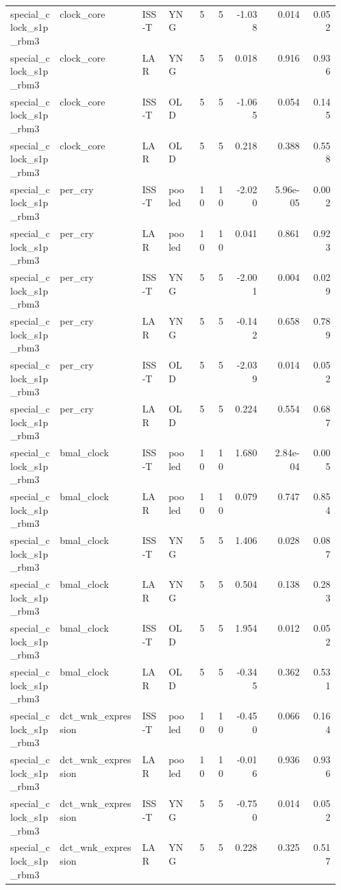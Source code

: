 \documentclass[11pt]{article}
\begin{document}
\begin{landscape}
\begin{longtable}{p{0.15\linewidth}p{0.25\linewidth}p{0.08\linewidth}p{0.08\linewidth}rrrrr}
special\_clock\_s1p\_rbm3 & clock\_core & ISS-T & YNG & 5 & 5 & -1.038 & 0.014 & 0.052 \\
special\_clock\_s1p\_rbm3 & clock\_core & LAR & YNG & 5 & 5 & 0.018 & 0.916 & 0.936 \\
special\_clock\_s1p\_rbm3 & clock\_core & ISS-T & OLD & 5 & 5 & -1.065 & 0.054 & 0.145 \\
special\_clock\_s1p\_rbm3 & clock\_core & LAR & OLD & 5 & 5 & 0.218 & 0.388 & 0.558 \\
special\_clock\_s1p\_rbm3 & per\_cry & ISS-T & pooled & 10 & 10 & -2.020 & 5.96e-05 & 0.002 \\
special\_clock\_s1p\_rbm3 & per\_cry & LAR & pooled & 10 & 10 & 0.041 & 0.861 & 0.923 \\
special\_clock\_s1p\_rbm3 & per\_cry & ISS-T & YNG & 5 & 5 & -2.001 & 0.004 & 0.029 \\
special\_clock\_s1p\_rbm3 & per\_cry & LAR & YNG & 5 & 5 & -0.142 & 0.658 & 0.789 \\
special\_clock\_s1p\_rbm3 & per\_cry & ISS-T & OLD & 5 & 5 & -2.039 & 0.014 & 0.052 \\
special\_clock\_s1p\_rbm3 & per\_cry & LAR & OLD & 5 & 5 & 0.224 & 0.554 & 0.687 \\
special\_clock\_s1p\_rbm3 & bmal\_clock & ISS-T & pooled & 10 & 10 & 1.680 & 2.84e-04 & 0.005 \\
special\_clock\_s1p\_rbm3 & bmal\_clock & LAR & pooled & 10 & 10 & 0.079 & 0.747 & 0.854 \\
special\_clock\_s1p\_rbm3 & bmal\_clock & ISS-T & YNG & 5 & 5 & 1.406 & 0.028 & 0.087 \\
special\_clock\_s1p\_rbm3 & bmal\_clock & LAR & YNG & 5 & 5 & 0.504 & 0.138 & 0.283 \\
special\_clock\_s1p\_rbm3 & bmal\_clock & ISS-T & OLD & 5 & 5 & 1.954 & 0.012 & 0.052 \\
special\_clock\_s1p\_rbm3 & bmal\_clock & LAR & OLD & 5 & 5 & -0.345 & 0.362 & 0.531 \\
special\_clock\_s1p\_rbm3 & dct\_wnk\_expression & ISS-T & pooled & 10 & 10 & -0.450 & 0.066 & 0.164 \\
special\_clock\_s1p\_rbm3 & dct\_wnk\_expression & LAR & pooled & 10 & 10 & -0.016 & 0.936 & 0.936 \\
special\_clock\_s1p\_rbm3 & dct\_wnk\_expression & ISS-T & YNG & 5 & 5 & -0.750 & 0.014 & 0.052 \\
special\_clock\_s1p\_rbm3 & dct\_wnk\_expression & LAR & YNG & 5 & 5 & 0.228 & 0.325 & 0.517 \\

\end{longtable}
\end{landscape}
\end{document}

